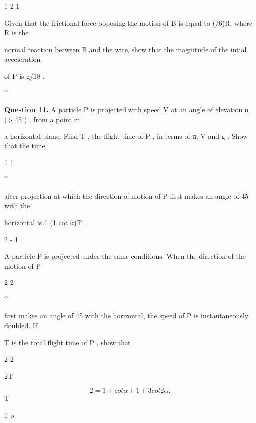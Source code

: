 \documentclass[12pt]{article}
\begin{document}
\begin{flushleft}
1 2 1\par
Given that the frictional force opposing the motion of B is equal to (/6)R, where R is the\par
normal reaction between B and the wire, show that the magnitude of the intial acceleration\par
of P is g/18 .\par
\textasciicircum{}\circ\par
\bigskip\textbf{Question 11.} A particle P is projected with speed V at an angle of elevation α (> 45 ) , from a point in\par
a horizontal plane. Find T , the flight time of P , in terms of α, V and g . Show that the time\par
1 1\par
\textasciicircum{}\circ\par
after projection at which the direction of motion of P first makes an angle of 45 with the\par
horizontal is 1 (1 cot α)T .\par
2 - 1\par
A particle P is projected under the same conditions. When the direction of the motion of P\par
2 2\par
\textasciicircum{}\circ\par
first makes an angle of 45 with the horizontal, the speed of P is instantaneously doubled. If\par
T is the total flight time of P , show that\par
2 2\par
2T\par
\[2 = 1 + cot α + 1 + 3 cot2 α .\]
T\par
1 p\par
\end{flushleft}
\end{document}
